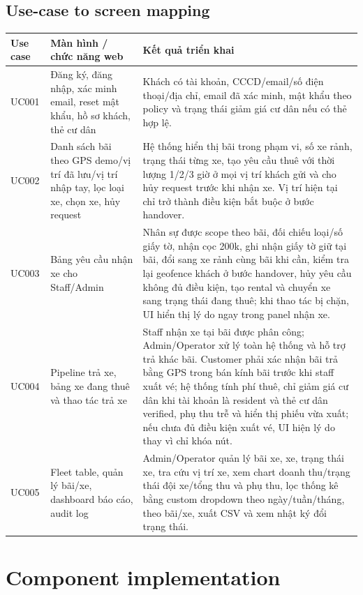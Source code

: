 \subsection{Use-case to screen mapping}
\begin{longtable}{P{0.18\textwidth}P{0.34\textwidth}P{0.38\textwidth}}
\toprule
\textbf{Use case} & \textbf{Màn hình / chức năng web} & \textbf{Kết quả triển khai} \\
\midrule
UC001 & Đăng ký, đăng nhập, xác minh email, reset mật khẩu, hồ sơ khách, thẻ cư dân & Khách có tài khoản, CCCD/email/số điện thoại/địa chỉ, email đã xác minh, mật khẩu theo policy và trạng thái giảm giá cư dân nếu có thẻ hợp lệ. \\
UC002 & Danh sách bãi theo GPS demo/vị trí đã lưu/vị trí nhập tay, lọc loại xe, chọn xe, hủy request & Hệ thống hiển thị bãi trong phạm vi, số xe rảnh, trạng thái từng xe, tạo yêu cầu thuê với thời lượng 1/2/3 giờ ở mọi vị trí khách gửi và cho hủy request trước khi nhận xe. Vị trí hiện tại chỉ trở thành điều kiện bắt buộc ở bước handover. \\
UC003 & Bảng yêu cầu nhận xe cho Staff/Admin & Nhân sự được scope theo bãi, đối chiếu loại/số giấy tờ, nhận cọc 200k, ghi nhận giấy tờ giữ tại bãi, đổi sang xe rảnh cùng bãi khi cần, kiểm tra lại geofence khách ở bước handover, hủy yêu cầu không đủ điều kiện, tạo rental và chuyển xe sang trạng thái đang thuê; khi thao tác bị chặn, UI hiển thị lý do ngay trong panel nhận xe. \\
UC004 & Pipeline trả xe, bảng xe đang thuê và thao tác trả xe & Staff nhận xe tại bãi được phân công; Admin/Operator xử lý toàn hệ thống và hỗ trợ trả khác bãi. Customer phải xác nhận bãi trả bằng GPS trong bán kính bãi trước khi staff xuất vé; hệ thống tính phí thuê, chỉ giảm giá cư dân khi tài khoản là resident và thẻ cư dân verified, phụ thu trễ và hiển thị phiếu vừa xuất; nếu chưa đủ điều kiện xuất vé, UI hiện lý do thay vì chỉ khóa nút. \\
UC005 & Fleet table, quản lý bãi/xe, dashboard báo cáo, audit log & Admin/Operator quản lý bãi xe, xe, trạng thái xe, tra cứu vị trí xe, xem chart doanh thu/trạng thái đội xe/tổng thu và phụ thu, lọc thống kê bằng custom dropdown theo ngày/tuần/tháng, theo bãi/xe, xuất CSV và xem nhật ký đổi trạng thái. \\
\bottomrule
\end{longtable}

\section{Component implementation}

